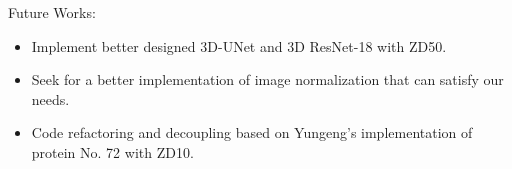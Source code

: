 Future Works:
\begin{itemize}
    \item Implement better designed 3D-UNet and 3D ResNet-18 with ZD50.
    \item Seek for a better implementation of image normalization that can satisfy our needs.
    \item Code refactoring and decoupling based on Yungeng's implementation of protein No. 72 with ZD10.
\end{itemize}